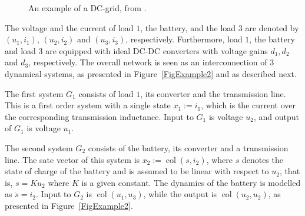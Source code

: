 \documentclass[11pt,a4paper,oneside,DIV=12,headings=small]{scrartcl}
\newcommand{\col}{\operatorname{col}}
\theoremstyle{plain}
\begin{document}
\begin{figure}[h!]
\caption{An example of a DC-grid, from \cite{Ebihara}.}
\label{FigExample1}
\end{figure}
The voltage and the current of load $1$, the battery, and the load $3$ are denoted by $(u_1, i_1)$, $(u_2, i_2)$ and $(u_3, i_3)$, respectively. Furthermore, load $1$, the battery and load $3$ are equipped with ideal DC-DC converters with voltage gains $d_1, d_2$ and $d_3$, respectively. The overall network is seen as an interconnection of $3$ dynamical systems, as presented in Figure~\ref{FigExample2} and as described next.

The first system $G_1$ consists of load $1$, its converter and the transmission line. This is a first order system with a single state $x_1:=i_1$, which is the current over the corresponding transmission inductance. Input to $G_1$ is voltage $u_2$, and output of $G_1$ is voltage $u_1$.

The second system $G_2$ consists of the battery, its converter and a transmission line. The sate vector of this system is $x_2:=\col(s, i_2)$, where $s$ denotes the state of charge of the battery and is assumed to be linear with respect to $u_2$, that is, $s=Ku_2$ where $K$ is a given constant. The dynamics of the battery is modelled as $\dot{s}=i_2$. Input to $G_2$ is $\col(u_1, u_3)$, while the output is $\col(u_2, u_2)$, as presented in Figure~\ref{FigExample2}. 
\end{document}
